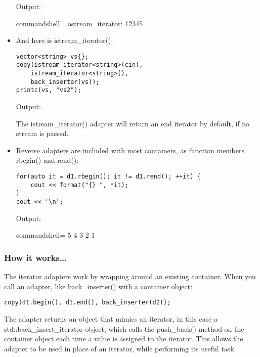 \begin{itemize}
Output:

\begin{tcblisting}{commandshell={}}
ostream_iterator: 12345
\end{tcblisting}

\item 
And here is istream\_iterator():

\begin{lstlisting}[style=styleCXX]
vector<string> vs{};
copy(istream_iterator<string>(cin),
	istream_iterator<string>(),
	back_inserter(vs));
printc(vs, "vs2");
\end{lstlisting}

Output:


The istream\_iterator() adapter will return an end iterator by default, if no stream is passed.

\item 
Reverse adapters are included with most containers, as function members rbegin() and rend():

\begin{lstlisting}[style=styleCXX]
for(auto it = d1.rbegin(); it != d1.rend(); ++it) {
	cout << format("{} ", *it);
}
cout << '\n';
\end{lstlisting}

Output:

\begin{tcblisting}{commandshell={}}
5 4 3 2 1
\end{tcblisting}
\end{itemize}

\subsubsection{How it works…}

The iterator adapters work by wrapping around an existing container. When you call an adapter, like back\_inserter() with a container object:

\begin{lstlisting}[style=styleCXX]
copy(d1.begin(), d1.end(), back_inserter(d2));
\end{lstlisting}

The adapter returns an object that mimics an iterator, in this case a std::back\_insert\_iterator object, which calls the push\_back() method on the container object each time a value is assigned to the iterator. This allows the adapter to be used in place of an iterator, while performing its useful task.

